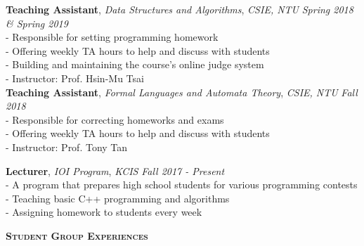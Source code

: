 \documentclass[10pt]{article}
\newenvironment{changemargin}[2]{%
  \begin{list}{}{%
    \setlength{\topsep}{0pt}%
    \setlength{\leftmargin}{#1}%
    \setlength{\rightmargin}{#2}%
    \setlength{\listparindent}{\parindent}%
    \setlength{\itemindent}{\parindent}%
    \setlength{\parsep}{\parskip}%
  }%
  \item[]}{\end{list}
}
\newcommand{\lineover}{
	\begin{changemargin}{-0.05in}{-0.05in}
		\vspace*{-8pt}
		\hrulefill \\
		\vspace*{-2pt}
	\end{changemargin}
}
\newcommand{\header}[1]{
	\begin{changemargin}{-0.5in}{-0.5in}
		\large{\bf \scshape{#1}}\\
  	\lineover
	\end{changemargin}
}
\newenvironment{body} {
	\vspace*{-16pt}
	\begin{changemargin}{-0.25in}{-0.5in}
  }	
	{\end{changemargin}
}
\begin{document}
\begin{body}
	\vspace{14pt}

	\textbf {Teaching Assistant}, {\textit{Data Structures and Algorithms}}, \emph{CSIE, NTU} \hfill \emph{Spring 2018 \& Spring 2019}\\
    	\hspace{12pt} - Responsible for setting programming homework\\
    	\hspace{12pt} - Offering weekly TA hours to help and discuss with students\\
    	\hspace{12pt} - Building and maintaining the course's online judge system\\
    	\hspace{12pt} - Instructor: Prof. Hsin-Mu Tsai\\
	\smallskip
{}
	\textbf {Teaching Assistant}, {\textit{Formal Languages and Automata Theory}}, \emph{CSIE, NTU} \hfill \emph{Fall 2018}\\
    	\hspace{12pt} - Responsible for correcting homeworks and exams\\
    	\hspace{12pt} - Offering weekly TA hours to help and discuss with students\\
    	\hspace{12pt} - Instructor: Prof. Tony Tan\\
	\smallskip
	
	\textbf {Lecturer}, {\textit{IOI Program}}, \emph{KCIS} \hfill \emph{Fall 2017 - Present}\\
    	\hspace{12pt} - A program that prepares high school students for various programming contests\\
    	\hspace{12pt} - Teaching basic C++ programming and algorithms\\
    	\hspace{12pt} - Assigning homework to students every week\\
	\smallskip
\fi

\end{body}

\smallskip


\header{Student Group Experiences}
\end{document}

